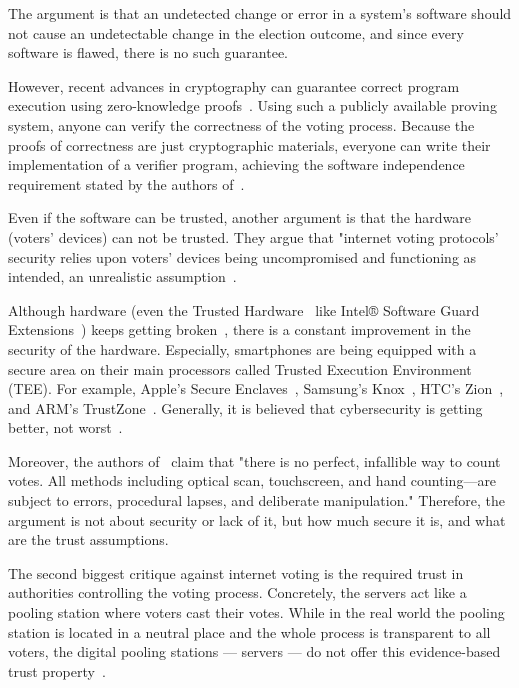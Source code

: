 \documentclass[runningheads]{llncs}
\begin{document}
The argument is that an undetected change or error in a system's software should not cause an undetectable change in the election outcome, and since every software is flawed, there is no such guarantee.

However, recent advances in cryptography can guarantee correct program execution using zero-knowledge proofs~\cite{parnoPinocchioNearlyPractical2013}. Using such a publicly available proving system, anyone can verify the correctness of the voting process. Because the proofs of correctness are just cryptographic materials, everyone can write their implementation of a verifier program, achieving the software independence requirement stated by the authors of~\cite{parkGoingBadWorse2021}.

Even if the software can be trusted, another argument is that the hardware (voters' devices) can not be trusted. They argue that "internet voting protocols' security relies upon voters' devices being uncompromised and functioning as intended, an unrealistic assumption~\cite{parkGoingBadWorse2021}.

Although hardware (even the Trusted Hardware~\cite{sionTrustedHardware2009} like Intel® Software Guard Extensions~\cite{mckeenIntelSoftwareGuard2016}) keeps getting broken~\cite{goodinIntelSGXVulnerable2020, IntelSGXBroken2019, bulckForeshadowExtractingKeys}, there is a constant improvement in the security of the hardware. Especially, smartphones are being equipped with a secure area on their main processors called Trusted Execution Environment (TEE). For example, Apple's Secure Enclaves~\cite{SecureEnclave}, Samsung's Knox~\cite{kanonovSecureContainersAndroid2016}, HTC's Zion~\cite{exodusZION}, and ARM's TrustZone~\cite{ARMSecurityTechnology}. Generally, it is believed that cybersecurity is getting better, not worst~\cite{golombBelieveItCybersecurity2018}.

Moreover, the authors of~\cite{appelEvidenceBasedElectionsCreate2019} claim that "there is no perfect, infallible way to count votes. All methods including optical scan, touchscreen, and hand counting—are subject to errors, procedural lapses, and deliberate manipulation." Therefore, the argument is not about security or lack of it, but how much secure it is, and what are the trust assumptions.

The second biggest critique against internet voting is the required trust in authorities controlling the voting process. Concretely, the servers act like a pooling station where voters cast their votes. While in the real world the pooling station is located in a neutral place and the whole process is transparent to all voters, the digital pooling stations — servers — do not offer this evidence-based trust property~\cite{starkEvidenceBasedElections2012}.
\end{document}
